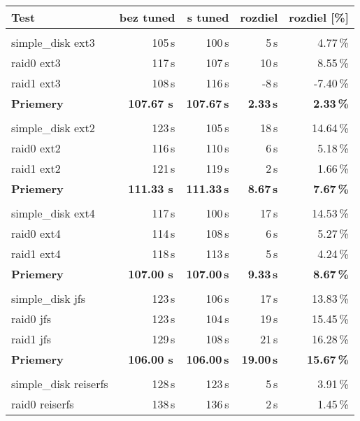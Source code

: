 \begin{table}[H]
\begin{center}
\begin{tabular}{|l|r r r r|}
    \hline
    \textbf{Test} & \textbf{bez tuned} & \textbf{s tuned} & \textbf{rozdiel} & \textbf{rozdiel [\%]} \\
    \hline & \\[-1em]\hline
    simple\_disk ext3 & 105\,s & 100\,s & 5\,s & 4.77\,\% \\
    raid0 ext3 & 117\,s & 107\,s & 10\,s & 8.55\,\% \\
    raid1 ext3 & 108\,s & 116\,s & -8\,s & -7.40\,\% \\
    \hline
    \textbf{Priemery} & \textbf{107.67 s}\,& \textbf{107.67\,s} & \textbf{2.33\,s} & \textbf{2.33\,\%} \\
    \hline & \\[-1em]\hline
    simple\_disk ext2 & 123\,s & 105\,s & 18\,s & 14.64\,\% \\
    raid0 ext2 & 116\,s & 110\,s & 6\,s & 5.18\,\% \\
    raid1 ext2 & 121\,s & 119\,s & 2\,s & 1.66\,\% \\
    \hline
    \textbf{Priemery} & \textbf{111.33 s}\,& \textbf{111.33\,s} & \textbf{8.67\,s} & \textbf{7.67\,\%} \\
    \hline & \\[-1em]\hline
    simple\_disk ext4 & 117\,s & 100\,s & 17\,s & 14.53\,\% \\
    raid0 ext4 & 114\,s & 108\,s & 6\,s & 5.27\,\% \\
    raid1 ext4 & 118\,s & 113\,s & 5\,s & 4.24\,\% \\
    \hline
    \textbf{Priemery} & \textbf{107.00 s}\,& \textbf{107.00\,s} & \textbf{9.33\,s} & \textbf{8.67\,\%} \\
    \hline & \\[-1em]\hline
    simple\_disk jfs & 123\,s & 106\,s & 17\,s & 13.83\,\% \\
    raid0 jfs & 123\,s & 104\,s & 19\,s & 15.45\,\% \\
    raid1 jfs & 129\,s & 108\,s & 21\,s & 16.28\,\% \\
    \hline
    \textbf{Priemery} & \textbf{106.00 s}\,& \textbf{106.00\,s} & \textbf{19.00\,s} & \textbf{15.67\,\%} \\
    \hline & \\[-1em]\hline
    simple\_disk reiserfs & 128\,s & 123\,s & 5\,s & 3.91\,\% \\
    raid0 reiserfs & 138\,s & 136\,s & 2\,s & 1.45\,\% \\

\end{tabular}
\end{center}
\end{table}
